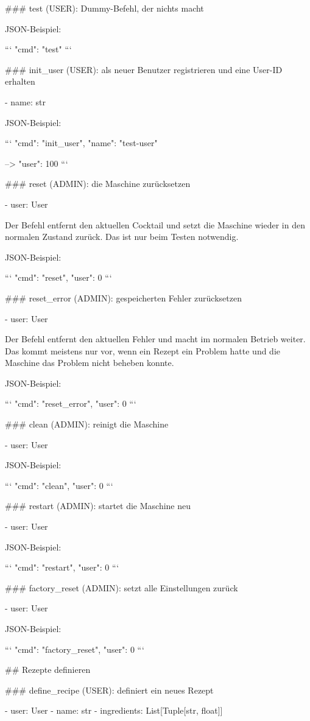 ### test (USER): Dummy-Befehl, der nichts macht

JSON-Beispiel:

```
{"cmd": "test"}
```

### init_user (USER): als neuer Benutzer registrieren und eine User-ID erhalten

- name: str

JSON-Beispiel:

```
{"cmd": "init_user", "name": "test-user"}

--> {"user": 100}
```

### reset (ADMIN): die Maschine zurücksetzen

- user: User

Der Befehl entfernt den aktuellen Cocktail und setzt die Maschine wieder in den normalen Zustand zurück. Das ist nur beim Testen notwendig.

JSON-Beispiel:

```
{"cmd": "reset", "user": 0}
```

### reset_error (ADMIN): gespeicherten Fehler zurücksetzen

- user: User

Der Befehl entfernt den aktuellen Fehler und macht im normalen Betrieb weiter. Das kommt meistens nur vor, wenn ein Rezept ein Problem hatte und die Maschine das Problem nicht beheben konnte.

JSON-Beispiel:

```
{"cmd": "reset_error", "user": 0}
```

### clean (ADMIN): reinigt die Maschine

- user: User

JSON-Beispiel:

```
{"cmd": "clean", "user": 0}
```

### restart (ADMIN): startet die Maschine neu

- user: User

JSON-Beispiel:

```
{"cmd": "restart", "user": 0}
```

### factory_reset (ADMIN): setzt alle Einstellungen zurück

- user: User

JSON-Beispiel:

```
{"cmd": "factory_reset", "user": 0}
```

## Rezepte definieren

### define_recipe (USER): definiert ein neues Rezept

- user: User
- name: str
- ingredients: List[Tuple[str, float]]

